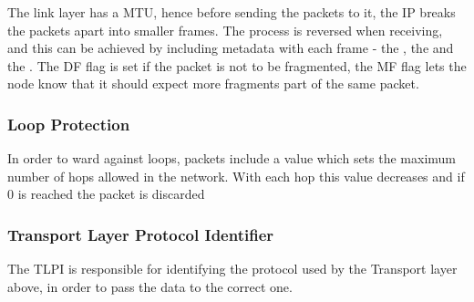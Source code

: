 		\par{The link layer has a MTU, hence before sending the packets to it, the IP breaks the packets apart into smaller frames. The process is reversed when receiving, and this can be achieved by including metadata with each frame - the  , the  and the . The DF flag is set if the packet is not to be fragmented, the MF flag lets the node know that it should expect more fragments part of the same packet.}


		\subsubsection{Loop Protection}

		\par{In order to ward against loops, packets include a value which sets the maximum number of hops allowed in the network. With each hop this value decreases and if 0 is reached the packet is discarded }

		\subsubsection{Transport Layer Protocol Identifier}

		\par{The TLPI is responsible for identifying the protocol used by the Transport layer above, in order to pass the data to the correct one.}
